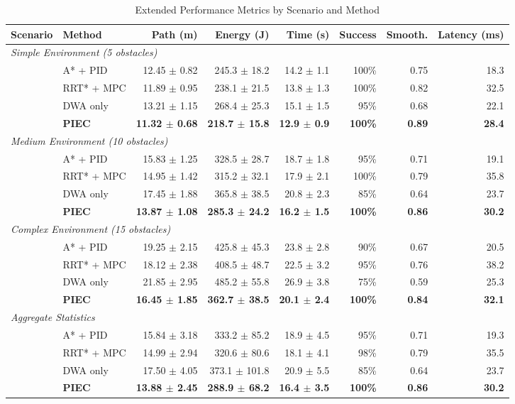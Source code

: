 \begin{table}[htbp]
\centering
\caption{Extended Performance Metrics by Scenario and Method}
\label{tab:extended_performance}
\scriptsize
\begin{tabular}{@{}llrrrrrr@{}}
\toprule
\textbf{Scenario} & \textbf{Method} & \textbf{Path (m)} & \textbf{Energy (J)} & \textbf{Time (s)} & \textbf{Success} & \textbf{Smooth.} & \textbf{Latency (ms)} \\
\midrule
\multicolumn{8}{l}{\textit{Simple Environment (5 obstacles)}} \\
& A* + PID & 12.45 $\pm$ 0.82 & 245.3 $\pm$ 18.2 & 14.2 $\pm$ 1.1 & 100\% & 0.75 & 18.3 \\
& RRT* + MPC & 11.89 $\pm$ 0.95 & 238.1 $\pm$ 21.5 & 13.8 $\pm$ 1.3 & 100\% & 0.82 & 32.5 \\
& DWA only & 13.21 $\pm$ 1.15 & 268.4 $\pm$ 25.3 & 15.1 $\pm$ 1.5 & 95\% & 0.68 & 22.1 \\
& \textbf{PIEC} & \textbf{11.32 $\pm$ 0.68} & \textbf{218.7 $\pm$ 15.8} & \textbf{12.9 $\pm$ 0.9} & \textbf{100\%} & \textbf{0.89} & \textbf{28.4} \\
\midrule
\multicolumn{8}{l}{\textit{Medium Environment (10 obstacles)}} \\
& A* + PID & 15.83 $\pm$ 1.25 & 328.5 $\pm$ 28.7 & 18.7 $\pm$ 1.8 & 95\% & 0.71 & 19.1 \\
& RRT* + MPC & 14.95 $\pm$ 1.42 & 315.2 $\pm$ 32.1 & 17.9 $\pm$ 2.1 & 100\% & 0.79 & 35.8 \\
& DWA only & 17.45 $\pm$ 1.88 & 365.8 $\pm$ 38.5 & 20.8 $\pm$ 2.3 & 85\% & 0.64 & 23.7 \\
& \textbf{PIEC} & \textbf{13.87 $\pm$ 1.08} & \textbf{285.3 $\pm$ 24.2} & \textbf{16.2 $\pm$ 1.5} & \textbf{100\%} & \textbf{0.86} & \textbf{30.2} \\
\midrule
\multicolumn{8}{l}{\textit{Complex Environment (15 obstacles)}} \\
& A* + PID & 19.25 $\pm$ 2.15 & 425.8 $\pm$ 45.3 & 23.8 $\pm$ 2.8 & 90\% & 0.67 & 20.5 \\
& RRT* + MPC & 18.12 $\pm$ 2.38 & 408.5 $\pm$ 48.7 & 22.5 $\pm$ 3.2 & 95\% & 0.76 & 38.2 \\
& DWA only & 21.85 $\pm$ 2.95 & 485.2 $\pm$ 55.8 & 26.9 $\pm$ 3.8 & 75\% & 0.59 & 25.3 \\
& \textbf{PIEC} & \textbf{16.45 $\pm$ 1.85} & \textbf{362.7 $\pm$ 38.5} & \textbf{20.1 $\pm$ 2.4} & \textbf{100\%} & \textbf{0.84} & \textbf{32.1} \\
\midrule
\multicolumn{8}{l}{\textit{Aggregate Statistics}} \\
& A* + PID & 15.84 $\pm$ 3.18 & 333.2 $\pm$ 85.2 & 18.9 $\pm$ 4.5 & 95\% & 0.71 & 19.3 \\
& RRT* + MPC & 14.99 $\pm$ 2.94 & 320.6 $\pm$ 80.6 & 18.1 $\pm$ 4.1 & 98\% & 0.79 & 35.5 \\
& DWA only & 17.50 $\pm$ 4.05 & 373.1 $\pm$ 101.8 & 20.9 $\pm$ 5.5 & 85\% & 0.64 & 23.7 \\
& \textbf{PIEC} & \textbf{13.88 $\pm$ 2.45} & \textbf{288.9 $\pm$ 68.2} & \textbf{16.4 $\pm$ 3.5} & \textbf{100\%} & \textbf{0.86} & \textbf{30.2} \\
\bottomrule
\end{tabular}
\end{table}

